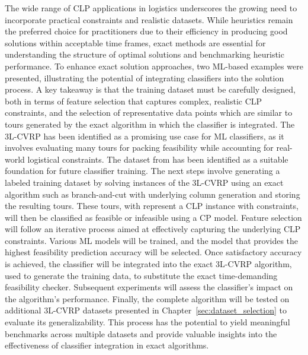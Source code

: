 The wide range of \gls{CLP} applications in logistics underscores the growing need to incorporate practical
constraints and realistic datasets. While heuristics remain the preferred choice for practitioners due to
their efficiency in producing good solutions within acceptable time frames, exact methods are essential for
understanding the structure of optimal solutions and benchmarking heuristic performance.
To enhance exact solution approaches, two \gls{ML}-based examples were presented, illustrating the potential
of integrating classifiers into the solution process. A key takeaway is that the training dataset must be
carefully designed, both in terms of feature selection that captures complex, realistic \gls{CLP} constraints,
and the selection of representative data points which are similar to tours generated by the exact algorithm
in which the classifier is integrated. The \gls{3L-CVRP} has been identified as a promising use case for \gls{ML} classifiers, as
it involves evaluating many tours for packing feasibility while accounting for real-world logistical
constraints. The dataset from \krebsADataSetText has been identified as a suitable foundation
for future classifier training. The next steps involve generating a labeled training dataset by solving
instances of the \gls{3L-CVRP} using an exact algorithm such as branch-and-cut with underlying column generation and storing the resulting tours.
These tours, with represent a \gls{CLP} instance with constraints, will then be classified as feasible or
infeasible using a \gls{CP} model. Feature selection will follow an iterative process aimed at effectively
capturing the underlying \gls{CLP} constraints. Various \gls{ML} models will be trained, and the model that
provides the highest feasibility prediction accuracy will be selected. Once satisfactory accuracy is achieved,
the classifier will be integrated into the exact \gls{3L-CVRP} algorithm, used to generate the training data,
to substitute the exact time-demanding feasibility checker.
Subsequent experiments will assess the classifier’s impact on the algorithm’s performance. Finally, the complete
algorithm will be tested on additional \gls{3L-CVRP} datasets presented in Chapter~\ref{sec:dataset_selection}
to evaluate its generalizability. This process has the potential to yield meaningful benchmarks across
multiple datasets and provide valuable insights into the effectiveness of classifier integration in exact algorithms.